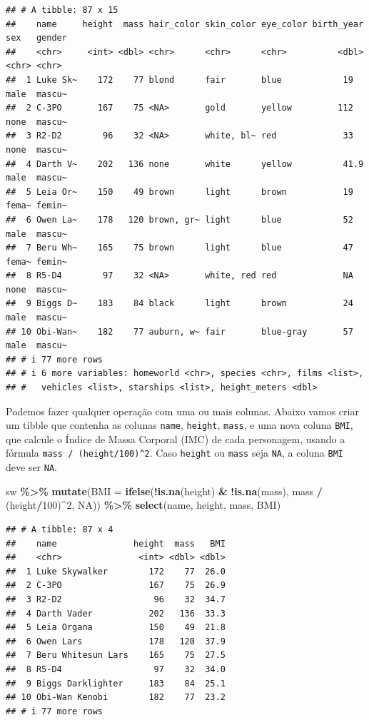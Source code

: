 \documentclass[
]{book}
\newenvironment{Shaded}{\begin{snugshade}}{\end{snugshade}}
\newcommand{\AttributeTok}[1]{\textcolor[rgb]{0.13,0.29,0.53}{#1}}
\newcommand{\ConstantTok}[1]{\textcolor[rgb]{0.56,0.35,0.01}{#1}}
\newcommand{\DecValTok}[1]{\textcolor[rgb]{0.00,0.00,0.81}{#1}}
\newcommand{\FunctionTok}[1]{\textcolor[rgb]{0.13,0.29,0.53}{\textbf{#1}}}
\newcommand{\NormalTok}[1]{#1}
\newcommand{\SpecialCharTok}[1]{\textcolor[rgb]{0.81,0.36,0.00}{\textbf{#1}}}
\begin{document}
\begin{verbatim}
## # A tibble: 87 x 15
##    name     height  mass hair_color skin_color eye_color birth_year sex   gender
##    <chr>     <int> <dbl> <chr>      <chr>      <chr>          <dbl> <chr> <chr> 
##  1 Luke Sk~    172    77 blond      fair       blue            19   male  mascu~
##  2 C-3PO       167    75 <NA>       gold       yellow         112   none  mascu~
##  3 R2-D2        96    32 <NA>       white, bl~ red             33   none  mascu~
##  4 Darth V~    202   136 none       white      yellow          41.9 male  mascu~
##  5 Leia Or~    150    49 brown      light      brown           19   fema~ femin~
##  6 Owen La~    178   120 brown, gr~ light      blue            52   male  mascu~
##  7 Beru Wh~    165    75 brown      light      blue            47   fema~ femin~
##  8 R5-D4        97    32 <NA>       white, red red             NA   none  mascu~
##  9 Biggs D~    183    84 black      light      brown           24   male  mascu~
## 10 Obi-Wan~    182    77 auburn, w~ fair       blue-gray       57   male  mascu~
## # i 77 more rows
## # i 6 more variables: homeworld <chr>, species <chr>, films <list>,
## #   vehicles <list>, starships <list>, height_meters <dbl>
\end{verbatim}

Podemos fazer qualquer operação com uma ou mais colunas. Abaixo vamos
criar um tibble que contenha as colunas \texttt{name}, \texttt{height}, \texttt{mass}, e uma
nova coluna \texttt{BMI}, que calcule o Índice de Massa Corporal (IMC) de cada
personagem, usando a fórmula \texttt{mass\ /\ (height/100)\^{}2}. Caso \texttt{height} ou
\texttt{mass} seja \texttt{NA}, a coluna \texttt{BMI} deve ser \texttt{NA}.

\begin{Shaded}
\begin{Highlighting}[]
\NormalTok{sw }\SpecialCharTok{\%\textgreater{}\%}
  \FunctionTok{mutate}\NormalTok{(}\AttributeTok{BMI =} \FunctionTok{ifelse}\NormalTok{(}\SpecialCharTok{!}\FunctionTok{is.na}\NormalTok{(height) }\SpecialCharTok{\&} \SpecialCharTok{!}\FunctionTok{is.na}\NormalTok{(mass), mass }\SpecialCharTok{/}\NormalTok{ (height}\SpecialCharTok{/}\DecValTok{100}\NormalTok{)}\SpecialCharTok{\^{}}\DecValTok{2}\NormalTok{, }\ConstantTok{NA}\NormalTok{)) }\SpecialCharTok{\%\textgreater{}\%}
  \FunctionTok{select}\NormalTok{(name, height, mass, BMI)}
\end{Highlighting}
\end{Shaded}

\begin{verbatim}
## # A tibble: 87 x 4
##    name               height  mass   BMI
##    <chr>               <int> <dbl> <dbl>
##  1 Luke Skywalker        172    77  26.0
##  2 C-3PO                 167    75  26.9
##  3 R2-D2                  96    32  34.7
##  4 Darth Vader           202   136  33.3
##  5 Leia Organa           150    49  21.8
##  6 Owen Lars             178   120  37.9
##  7 Beru Whitesun Lars    165    75  27.5
##  8 R5-D4                  97    32  34.0
##  9 Biggs Darklighter     183    84  25.1
## 10 Obi-Wan Kenobi        182    77  23.2
## # i 77 more rows
\end{verbatim}
\end{document}
